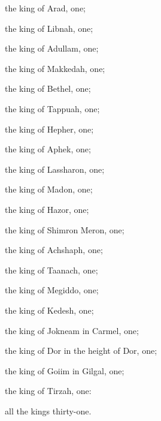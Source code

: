 {\par }{\MM the king of Arad, one;
\par }{\MM {}the king of Libnah, one;
\par }{\MM the king of Adullam, one;
\par }{\MM {}the king of Makkedah, one;
\par }{\MM the king of Bethel, one;
\par }{\MM {}the king of Tappuah, one;
\par }{\MM the king of Hepher, one;
\par }{\MM {}the king of Aphek, one;
\par }{\MM the king of Lassharon, one;
\par }{\MM {}the king of Madon, one;
\par }{\MM the king of Hazor, one;
\par }{\MM {}the king of Shimron Meron, one;
\par }{\MM the king of Achshaph, one;
\par }{\MM {}the king of Taanach, one;
\par }{\MM the king of Megiddo, one;
\par }{\MM {}the king of Kedesh, one;
\par }{\MM the king of Jokneam in Carmel, one;
\par }{\MM {}the king of Dor in the height of Dor, one;
\par }{\MM the king of Goiim in Gilgal, one;
\par }{\MM {}the king of Tirzah, one:
\par }{\MM all the kings thirty-one.

}

